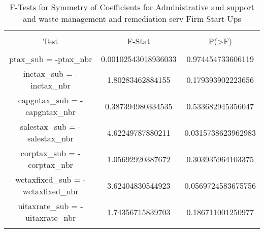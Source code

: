 
\begin{table}[!htbp] \centering 
  \caption{F-Tests for Symmetry of Coefficients for Administrative and support and waste management and remediation serv Firm Start Ups} 
  \label{} 
\begin{tabular}{@{\extracolsep{5pt}} ccc} 
\\[-1.8ex]\hline 
\hline \\[-1.8ex] 
Test & F-Stat & P(\textgreater F) \\ 
\hline \\[-1.8ex] 
ptax\_sub = -ptax\_nbr & 0.00102543018936033 & 0.974454733606119 \\ 
inctax\_sub = -inctax\_nbr & 1.80283462884155 & 0.179393902223656 \\ 
capgntax\_sub = -capgntax\_nbr & 0.387394980334535 & 0.533682945356047 \\ 
salestax\_sub = -salestax\_nbr & 4.62249787880211 & 0.0315738623962983 \\ 
corptax\_sub = -corptax\_nbr & 1.05692920387672 & 0.303935964103375 \\ 
wctaxfixed\_sub = -wctaxfixed\_nbr & 3.62404830544923 & 0.0569724583675756 \\ 
uitaxrate\_sub = -uitaxrate\_nbr & 1.74356715839703 & 0.186711001250977 \\ 
\hline \\[-1.8ex] 
\end{tabular} 
\end{table} 
